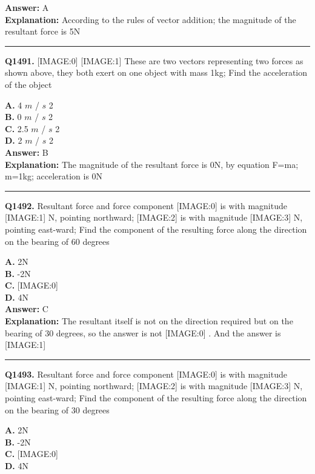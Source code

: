 \documentclass[12pt]{article}
\begin{document}
\textbf{Answer:} A \\
\textbf{Explanation:} According to the rules of vector addition; the magnitude of the resultant force is 5N

\hrule
\vspace{1em}


\noindent
\textbf{Q1491.} [IMAGE:0]
[IMAGE:1]
These are two vectors representing two forces as shown above, they both exert on one object with mass 1kg; Find the acceleration of the object



\textbf{A.} 4
$𝑚$
/
$𝑠$
2 \\
\textbf{B.} 0
$𝑚$
/
$𝑠$
2 \\
\textbf{C.} 2.5
$𝑚$
/
$𝑠$
2 \\
\textbf{D.} 2
$𝑚$
/
$𝑠$
2 \\

\textbf{Answer:} B \\
\textbf{Explanation:} The magnitude of the resultant force is 0N, by equation F=ma; m=1kg; acceleration is 0N

\hrule
\vspace{1em}


\noindent
\textbf{Q1492.} Resultant force and force component
[IMAGE:0]
is with magnitude
[IMAGE:1]
N, pointing northward;
[IMAGE:2]
is with magnitude
[IMAGE:3]
N, pointing east-ward; Find the component of the resulting force along the direction on the bearing of 60 degrees



\textbf{A.} 2N \\
\textbf{B.} -2N \\
\textbf{C.} [IMAGE:0] \\
\textbf{D.} 4N \\

\textbf{Answer:} C \\
\textbf{Explanation:} The resultant itself is not on the direction required but on the bearing of 30 degrees, so the answer is not
[IMAGE:0]
. And the answer is
[IMAGE:1]

\hrule
\vspace{1em}


\noindent
\textbf{Q1493.} Resultant force and force component
[IMAGE:0]
is with magnitude
[IMAGE:1]
N, pointing northward;
[IMAGE:2]
is with magnitude
[IMAGE:3]
N, pointing east-ward; Find the component of the resulting force along the direction on the bearing of 30 degrees



\textbf{A.} 2N \\
\textbf{B.} -2N \\
\textbf{C.} [IMAGE:0] \\
\textbf{D.} 4N \\
\end{document}
